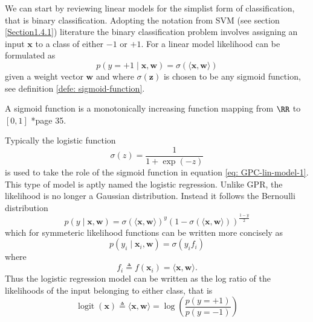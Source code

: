 We can start by reviewing linear models for the simplist form of classification, that is binary classification. Adopting the notation from SVM (see section \ref{Section1.4.1}) literature the binary classification problem involves assigning an input $\bm{x}$ to a class of either $-1$ or $+1$. For a linear model likelihood can be formulated as
\begin{equation} \label{eq: GPC-lin-model-1}
    p \left( y=+1 \mid \bm{x} , \bm{w} \right) = \sigma \left( \langle \bm{x} , \bm{w} \rangle \right)
\end{equation}
given a weight vector $\bm{w}$ and where $\sigma (\bm{z})$ is chosen to be any sigmoid function, see definition \ref{defe: sigmoid-function}.
\begin{defe} \label{defe: sigmoid-function}
    A sigmoid function is a monotonically increasing function mapping from $\RR$ to $\left[ 0,1 \right]$ \cite{RasmussenCarlEdward2006Gpfm}*{page 35}.
\end{defe}
Typically the logistic function
\begin{equation}
    \sigma (z) = \frac{1}{1 + \exp (-z)}
\end{equation}
is used to take the role of the sigmoid function in equation \ref{eq: GPC-lin-model-1}. This type of model is aptly named the logistic regression. Unlike GPR, the likelihood is no longer a Gaussian distribution. Instead it follows the Bernoulli distribution
\begin{equation*}
    p \left( y \mid \bm{x} , \bm{w} \right) = \sigma \left( \langle \bm{x} , \bm{w} \rangle \right)^{y} \left( 1 - \sigma \left( \langle \bm{x} , \bm{w} \rangle \right) \right)^{\frac{1 - y}{2}}
\end{equation*}
which for symmeteric likelihood functions can be written more concisely as
\begin{equation*}
    p \left( y_i \mid \bm{x}_i , \bm{w} \right) = \sigma \left( y_i f_i \right)
\end{equation*}
where
\begin{equation} \label{eq: GPC-lin-latent-func}
    f_i \triangleq f \left( \bm{x}_i \right) = \langle \bm{x} , \bm{w} \rangle .
\end{equation}
Thus the logistic regression model can be written as the log ratio of the likelihoods of the input belonging to either class, that is
\begin{equation*}
    \operatorname{logit} \left( \bm{x} \right) \triangleq \langle \bm{x} , \bm{w} \rangle = \log \left( \frac{p \left( y = +1 \right)}{p \left( y = -1 \right)} \right)
\end{equation*}
